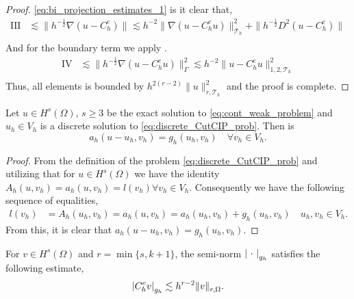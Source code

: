 \begin{proof}
    \eqref{eq:bi_projection_estimates_1} is it clear that,
    \begin{equation}
        \begin{split}
            \mathrm{III}  & \lesssim  \|h^{-\frac{1}{2}}  \nabla ( u - C_{h}^{e})  \|_{  }^{  }  \lesssim h^{-2} \| \nabla ( u - C^{e}_{h}u)  \|_{ \mathcal{T} _{h}
                          }^{ 2 } + \| h^{-\frac{1}{2}} D^2  ( u - C_{h}^{e})  \|_{  }^{  } \\
    \end{split}
\end{equation}
    And for the boundary term we apply .
        \begin{equation}
        \begin{split}
            \mathrm{IV}  & \lesssim \| h^{-\frac{1}{2}} \nabla  ( u - C_{h}^{e}u ) \|_{ \Gamma  }^{2  }  \lesssim  h^{-2} \|    u - C_{h}^{e}u     \|_{1,2, \mathcal{T}_{h}   }^{2  } \\
        \end{split}
        \end{equation}
    Thus, all elements is bounded by $ h^{2(r-2)}  \| u \|_{ r, \mathcal{T}_{h}   }^{2  } $  and the proof is complete.
\end{proof}

\begin{lemma}
Let $u \in H^{s}( \Omega )  $, $ s\ge 3 $  be the exact solution to   \eqref{eq:cont_weak_problem} and $u_{h} \in V_{h}$ is a discrete solution to \eqref{eq:discrete_CutCIP_prob}. Then is \[
    a_{h}( u - u_{h}, v_{h}) = g_{h} ( u_{h}, v_{h}) \quad \forall v_{h} \in V_{h}.
    \]
\end{lemma}

\begin{proof}
   From the definition of the problem \eqref{eq:discrete_CutCIP_prob} and utilizing that for $u \in H^{s}( \Omega ) $ we have the identity  $A_{h}( u,v_{h}) = a_{h}( u,v_{h}) = l(v_{h} ) \forall v_{h} \in V_{h} $. Consequently we have the following
   sequence of equalities,  \[
       \begin{split}
   l(v_{h} ) & =  A_{h}( u_{h},v_{h}) =  a_{h}( u,v_{h})  = a_{h}( u_{h},v_{h})+g_{h}( u_{h},v_{h})  \quad  u_{h},v_{h} \in  V_{h}.
       \end{split}
   \]
    From this, it is clear that $a_{h}( u -  u_{h}, v_{h}) = g_{h}( u_{h},v_{h})  $.
\end{proof}

\begin{assumption}[EP2]
    \label{as:bi_EP2}
    For $v \in H^{s}( \Omega ) $ and $r = \min \{s,k+1 \} $, the semi-norm $\left\lvert  \ \cdot \   \right\rvert_{g_{h}} $ satisfies the following estimate, \[
    \left\lvert  C _{h}^{e} v  \right\rvert _{g_{h}} \lesssim  h^{r-2} \| v \|_{ r,\Omega  }^{  }.
    \]
\end{assumption}


